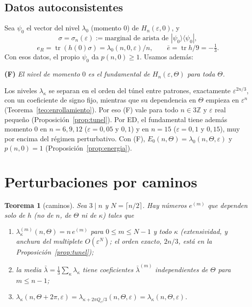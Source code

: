 \documentclass[11pt,a4paper]{article}
\newtheorem{teorema}{Teorema}
\theoremstyle{definition}
\theoremstyle{remark}
\newcommand{\tr}{\operatorname{tr}}
\newcommand{\ket}[1]{|#1\rangle}
\newcommand{\bra}[1]{\langle #1|}
\newcommand{\eps}{\varepsilon}
\begin{document}
\subsection{Datos autoconsistentes}\label{sec:datos}

Sea $\psi_0$ el vector del nivel $\lambda_0$ (momento $0$) de $H_n(\eps,0)$, y
\[
  \sigma=\sigma_n(\eps):=\text{marginal de arista de }\ket{\psi_0}\bra{\psi_0},
\]
\[
  e_R=\tr(h(0)\sigma)=\lambda_0(n,0,\eps)/n,\qquad \bar e=\tr h/9=-\tfrac13 .
\]
Con esos datos, el propio $\psi_0$ da $p(n,0)\ge1$. Usamos además:

\smallskip\noindent\textbf{(F)} \emph{El nivel de momento $0$ es el fundamental de $H_n(\eps,\Theta)$
para toda $\Theta$.}

\smallskip
Los niveles $\lambda_\kappa$ se separan en el orden del túnel entre patrones, exactamente $\eps^{2n/3}$, con un
coeficiente de signo fijo, mientras que su dependencia en $\Theta$ empieza en $\eps^n$
(Teorema~\ref{teo:enrollamiento}). Por eso (F) vale para todo $n\in3\mathbb Z$ y $\eps$ real pequeño
(Proposición~\ref{prop:tunel}). Por ED, el fundamental tiene además momento $0$ en $n=6,9,12$
($\eps=0{,}05$ y $0{,}1$) y en $n=15$ ($\eps=0{,}1$ y $0{,}15$), muy por encima del régimen perturbativo. Con (F),
$E_0(n,\Theta)=\lambda_0(n,\Theta,\eps)$ y $p(n,0)=1$ (Proposición~\ref{prop:energia}).

\section{Perturbaciones por caminos}\label{sec:caminos}

\begin{teorema}[caminos]\label{teo:caminos}
Sea $3\mid n$ y $N=\lceil n/2\rceil$. Hay números $e^{(m)}$ que dependen solo de $h$ (no de $n$, de
$\Theta$ ni de $\kappa$) tales que
\begin{enumerate}
\item $\lambda_\kappa^{(m)}(n,\Theta)=n\,e^{(m)}$ para $0\le m\le N-1$ y todo $\kappa$
  (extensividad, y anchura del multiplete $O(\eps^{N})$; el orden exacto, $2n/3$, está en la
  Proposición~\ref{prop:tunel});
\item la media $\bar\lambda=\frac13\sum_\kappa\lambda_\kappa$ tiene coeficientes $\bar\lambda^{(m)}$ independientes
  de $\Theta$ para $m\le n-1$;
\item $\lambda_\kappa(n,\Theta+2\pi,\eps)=\lambda_{\kappa+2\pi Q_c/3}(n,\Theta,\eps)=\lambda_\kappa(n,\Theta,\eps)$.
\end{enumerate}
\end{teorema}
\end{document}
